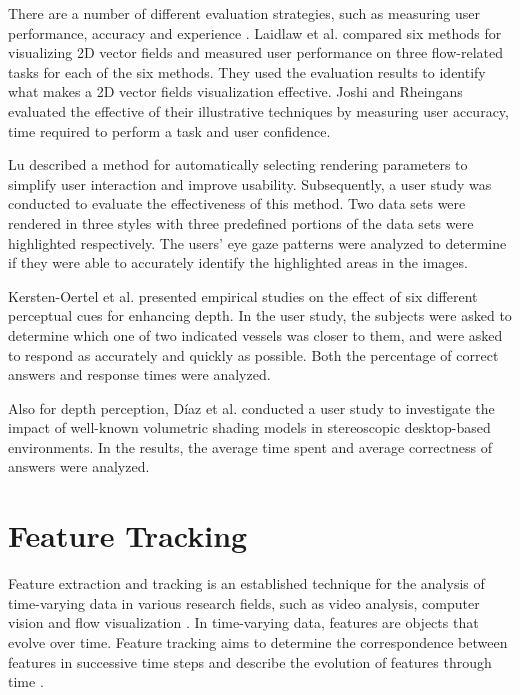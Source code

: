 There are a number of different evaluation strategies, such as measuring user performance, accuracy and experience \cite{redmond_influencing_2010}. Laidlaw et al. \cite{laidlaw_quantitative_2001} compared six methods for visualizing 2D vector fields and measured user performance on three flow-related tasks for each of the six methods. They used the evaluation results to identify what makes a 2D vector fields visualization effective.
Joshi and Rheingans \cite{joshi_evaluation_2008} evaluated the effective of their illustrative techniques by measuring user accuracy, time required to perform a task and user confidence.

Lu \cite{lu_volume_2010} described a method for automatically selecting rendering parameters to simplify user interaction and improve usability. Subsequently, a user study was conducted to evaluate the effectiveness of this method. Two data sets were rendered in three styles with three predefined portions of the data sets were highlighted respectively. The users' eye gaze patterns were analyzed to determine if they were able to accurately identify the highlighted areas in the images.

Kersten-Oertel et al. \cite{kersten-oertel_evaluation_2014} presented empirical studies on the effect of six different perceptual cues for enhancing depth. In the user study, the subjects were asked to determine which one of two indicated vessels was closer to them, and were asked to respond as accurately and quickly as possible. Both the percentage of correct answers and response times were analyzed.

Also for depth perception, D{\'i}az et al. \cite{diaz_perceptual_2015} conducted a user study to investigate the impact of well-known volumetric shading models in stereoscopic desktop-based environments. In the results, the average time spent and average correctness of answers were analyzed.

\section{Feature Tracking}
Feature extraction and tracking is an established technique for the analysis of time-varying data in various research fields, such as video analysis, computer vision and flow visualization \cite{muelder_interactive_2009}.
In time-varying data, features are objects that evolve over time. Feature tracking aims to determine the correspondence between features in successive time steps and describe the evolution of features through time \cite{post_state_2003}.

